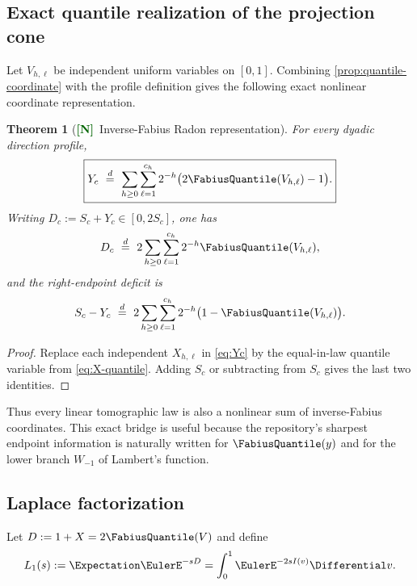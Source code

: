 \documentclass[11pt]{article}
\numberwithin{equation}{section}
\newtheorem{theorem}{Theorem}[section]
\theoremstyle{definition}
\theoremstyle{remark}
\newcommand{\New}{\textcolor{darkgreen}{\textsf{\textbf{[N]}}}}
\begin{document}
\subsection{Exact quantile realization of the projection cone}

Let $V_{h,\ell}$ be independent uniform variables on $[0,1]$.  Combining
\cref{prop:quantile-coordinate} with the profile definition gives the following
exact nonlinear coordinate representation.

\begin{theorem}[\New\ Inverse-Fabius Radon representation]
\label{thm:inverse-Fabius-profile}
For every dyadic direction profile,
\begin{equation}
 \boxed{
 Y_c\ \stackrel d=\
 \sum_{h\ge0}\sum_{\ell=1}^{c_h}
 2^{-h}\bigl(2\FabiusQuantile(V_{h,\ell})-1\bigr).}
 \label{eq:inverse-Fabius-profile}
\end{equation}
Writing $D_c:=S_c+Y_c\in[0,2S_c]$, one has
\begin{equation}
 D_c\ \stackrel d=\
 2\sum_{h\ge0}\sum_{\ell=1}^{c_h}2^{-h}\FabiusQuantile(V_{h,\ell}),
 \label{eq:Dc-inverse}
\end{equation}
and the right-endpoint deficit is
\begin{equation}
 S_c-Y_c\ \stackrel d=\
 2\sum_{h\ge0}\sum_{\ell=1}^{c_h}2^{-h}
 \bigl(1-\FabiusQuantile(V_{h,\ell})\bigr).
 \label{eq:deficit-inverse}
\end{equation}
\end{theorem}

\begin{proof}
Replace each independent $X_{h,\ell}$ in \eqref{eq:Yc} by the equal-in-law
quantile variable from \eqref{eq:X-quantile}.  Adding $S_c$ or subtracting from
$S_c$ gives the last two identities.
\end{proof}

Thus every linear tomographic law is also a nonlinear sum of inverse-Fabius
coordinates.  This exact bridge is useful because the repository's sharpest
endpoint information is naturally written for $\FabiusQuantile(y)$ and for the lower branch
$W_{-1}$ of Lambert's function.

\subsection{Laplace factorization}

Let $D:=1+X=2\FabiusQuantile(V)$ and define
\begin{equation}
 L_1(s):=\Expectation\EulerE^{-sD}
 =\int_0^1\EulerE^{-2sI(v)}\Differential v.
 \label{eq:L1-inverse}
\end{equation}
\end{document}
